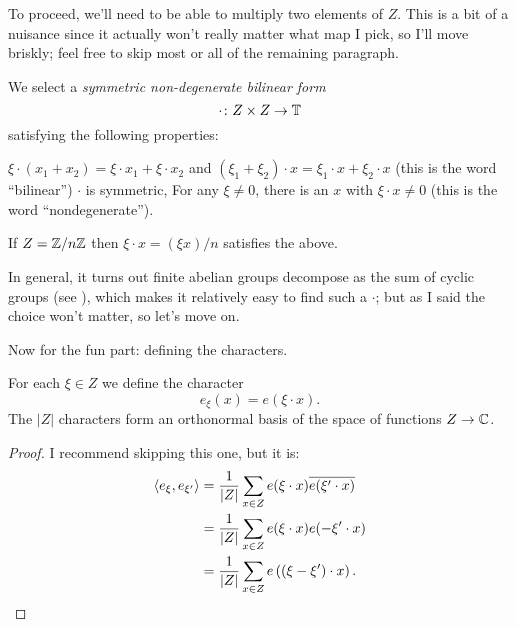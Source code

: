 To proceed, we'll need to be able to multiply two elements of $Z$.
This is a bit of a nuisance since it actually won't really
matter what map I pick, so I'll move briskly;
feel free to skip most or all of the remaining paragraph.
\begin{definition}
We select a \emph{symmetric non-degenerate bilinear form}
\[ \cdot \colon Z \times Z \to \mathbb T \]
satisfying the following properties:
\begin{itemize}
	\ii $\xi \cdot (x_1 + x_2) = \xi \cdot x_1 + \xi \cdot x_2$
	and $(\xi_1 + \xi_2) \cdot x = \xi_1 \cdot x + \xi_2 \cdot x$
	(this is the word ``bilinear'')
	\ii $\cdot$ is symmetric,
	\ii For any $\xi \neq 0$, there is an $x$ with $\xi \cdot x \neq 0$
	(this is the word ``nondegenerate'').
\end{itemize}
\end{definition}
\begin{example}
	If $Z = \mathbb Z/n\mathbb Z$ then $\xi \cdot x = (\xi x)/n$ satisfies the above.
\end{example}
In general, it turns out finite abelian groups
decompose as the sum of cyclic groups (see ),
which makes it relatively easy to find such a $\cdot$;
but as I said the choice won't matter, so let's move on.

Now for the fun part: defining the characters.
\begin{proposition}
	For each $\xi \in Z$ we define the character
	\[ e_\xi(x) = e(\xi \cdot x). \]
	The $|Z|$ characters form an orthonormal basis of the
	space of functions $Z \to \mathbb C$.
\end{proposition}
\begin{proof}
	I recommend skipping this one, but it is:
	\begin{align*}
		\left< e_{\xi}, e_{\xi'} \right>
		&= \frac{1}{|Z|} \sum_{x \in Z} e(\xi \cdot x) \overline{e(\xi' \cdot x)} \\
		&= \frac{1}{|Z|} \sum_{x \in Z} e(\xi \cdot x) e(-\xi' \cdot x) \\
		&= \frac{1}{|Z|} \sum_{x \in Z} e\left( (\xi-\xi') \cdot x \right).
	\end{align*}
\end{proof}

